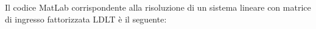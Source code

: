 Il codice MatLab corrispondente alla risoluzione di un sistema lineare con matrice di ingresso fattorizzata LDLT è il seguente:
